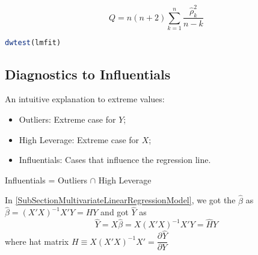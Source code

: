 \begin{itemize}[topsep=2pt,itemsep=2pt]
\begin{itemize}
        \begin{equation}
            Q=n(n+2)\sum_{k=1}^n\dfrac{\hat{\rho}_k^2}{n-k} 
        \end{equation}
        
        
    \end{itemize}

\begin{rcode}
\begin{lstlisting}[language=R]
dwtest(lmfit)
\end{lstlisting}

\end{rcode}   
        
\end{itemize}














    
        
        


\subsection{Diagnostics to Influentials}\label{SubSubSectionDiagnosticsToInfluentials}
    An intuitive explanation to extreme values:
    \begin{itemize}[topsep=2pt,itemsep=2pt]
        \item Outliers: Extreme case for $ Y $;
        \item High Leverage: Extreme case for $ X $;
        \item Influentials: Cases that influence the regression line.
    \end{itemize}

    \begin{point}
        Influentials = Outliers $ \cap $ High Leverage
    \end{point}
    

    In \autoref{SubSectionMultivariateLinearRegressionModel}, we got the $ \hat{\beta}  $ as $\hat{ \beta} = (X'X)^{-1}X'Y=HY $ and got $ \hat{Y} $ as 
    \begin{equation}
        \hat{Y}= X\hat{\beta }=X(X'X)^{-1}X'Y=\hat{H}Y
    \end{equation}
    where hat matrix $ H\equiv  X(X'X)^{-1}X'=\dfrac{\partial^{} \hat{Y}}{\partial Y^{}}$

